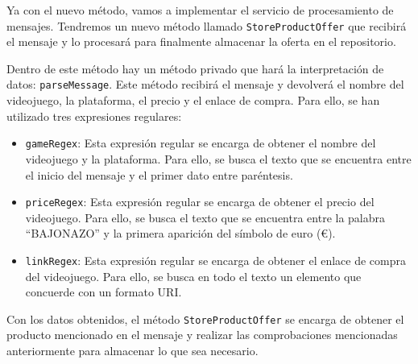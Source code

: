 Ya con el nuevo método, vamos a implementar el servicio de procesamiento de 
mensajes. Tendremos un nuevo método llamado \verb|StoreProductOffer| que recibirá 
el mensaje y lo procesará para finalmente almacenar la oferta en el repositorio.

Dentro de este método hay un método privado que hará la interpretación de datos: 
\verb|parseMessage|. Este método recibirá el mensaje y devolverá el nombre del 
videojuego, la plataforma, el precio y el enlace de compra. Para ello, se han 
utilizado tres expresiones regulares:

\begin{itemize}
    \item \verb|gameRegex|: Esta expresión regular se encarga de obtener el nombre 
    del videojuego y la plataforma. Para ello, se busca el texto que se encuentra 
    entre el inicio del mensaje y el primer dato entre paréntesis.
    \item \verb|priceRegex|: Esta expresión regular se encarga de obtener el precio 
    del videojuego. Para ello, se busca el texto que se encuentra entre la palabra 
    ``BAJONAZO'' y la primera aparición del símbolo de euro (€).
    \item \verb|linkRegex|: Esta expresión regular se encarga de obtener el enlace 
    de compra del videojuego. Para ello, se busca en todo el texto un elemento que 
    concuerde con un formato URI.
\end{itemize}

Con los datos obtenidos, el método \verb|StoreProductOffer| se encarga de obtener 
el producto mencionado en el mensaje y realizar las comprobaciones mencionadas 
anteriormente para almacenar lo que sea necesario.
